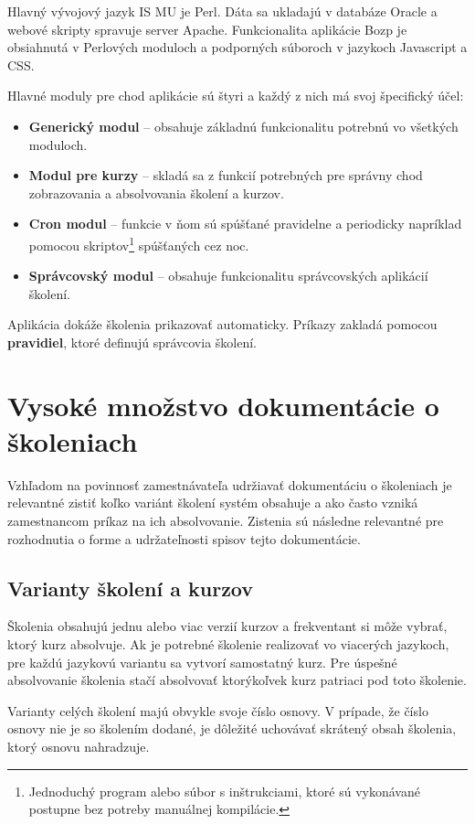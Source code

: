 \documentclass[
  digital,     %
  oneside,     %
  nosansbold,  %
  nocolorbold, %
  lof,         %
  nolot,         %
]{fithesis4}
\begin{document}
\noindent
Hlavný vývojový jazyk IS MU je Perl. Dáta sa ukladajú v databáze Oracle a webové skripty spravuje server Apache. Funkcionalita aplikácie Bozp je obsiahnutá v Perlových moduloch a podporných súboroch v jazykoch Javascript a CSS.

Hlavné moduly pre chod aplikácie sú štyri a každý z nich má svoj špecifický účel:

\begin{itemize}
    \item \textbf{Generický modul} – obsahuje základnú funkcionalitu potrebnú vo všetkých moduloch.
    \item \textbf{Modul pre kurzy} – skladá sa z funkcií potrebných pre správny chod zobrazovania a absolvovania školení a kurzov.
    \item \textbf{Cron modul} – funkcie v ňom sú spúšťané pravidelne a periodicky napríklad pomocou skriptov\footnote{Jednoduchý program alebo súbor s inštrukciami, ktoré sú vykonávané postupne bez potreby manuálnej kompilácie.} spúšťaných cez noc.
    \item \textbf{Správcovský modul} – obsahuje funkcionalitu správcovských aplikácií školení.
\end{itemize}

\noindent
Aplikácia dokáže školenia prikazovať automaticky. Príkazy zakladá pomocou \textbf{pravidiel}, ktoré definujú správcovia školení.~\cite[15]{kandova2019}

\section{Vysoké množstvo dokumentácie o školeniach}
Vzhľadom na povinnosť zamestnávateľa udržiavať dokumentáciu o školeniach je relevantné zistiť koľko variánt školení systém obsahuje a ako často vzniká zamestnancom príkaz na ich absolvovanie. Zistenia sú následne relevantné pre rozhodnutia o forme a udržateľnosti spisov tejto dokumentácie.

\subsection*{Varianty školení a kurzov}
Školenia obsahujú jednu alebo viac verzií kurzov a frekventant si môže vybrať, ktorý kurz absolvuje. Ak je potrebné školenie realizovať vo viacerých jazykoch, pre každú jazykovú variantu sa vytvorí samostatný kurz. Pre úspešné absolvovanie školenia stačí absolvovať ktorýkoľvek kurz patriaci pod toto školenie.

Varianty celých školení majú obvykle svoje číslo osnovy. V prípade, že číslo osnovy nie je so školením dodané, je dôležité uchovávať skrátený obsah školenia, ktorý osnovu nahradzuje.
\end{document}
